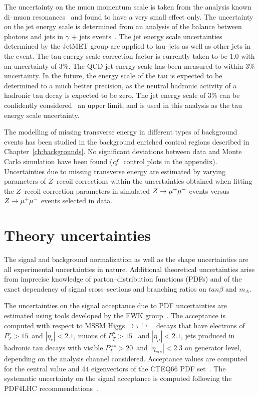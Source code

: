 The uncertainty on the muon momentum scale is taken from the analysis known
di--muon resonances~\cite{CMS_AN_2010-059} and found to have a very small effect
only.  The uncertainty on the jet energy scale is determined from an analysis of
the \pt balance between photons and jets in $\gamma$ + jets
events~\cite{CMS-PAS-JME-10-010}.  The jet energy scale uncertainties determined
by the JetMET group are applied to tau--jets as well as other jets in the event.
The tau energy scale correction factor is currently taken to be 1.0 with an
uncertainty of 3\%.  The QCD jet energy scale has been measured to within 3\%
uncertainty.  In the future, the energy scale of the tau is expected to be
determined to a much better precision, as the neutral hadronic activity of a
hadronic tau decay is expected to be zero. The jet energy scale of 3\% can be
confidently considered~\cite{CMS-PAS-TAU-11-001} an upper limit, and is used in
this analysis as the tau energy scale uncertainty.

The modelling of missing transverse energy in different types of background
events has been studied in the background enriched control regions described in
Chapter~\ref{ch:backgrounds}.  No significant deviations between data and
Monte Carlo simulation have been found ({\it cf.}\ control plots in the
appendix).  Uncertainties due to missing transverse energy are estimated by
varying parameters of $Z$--recoil corrections within the uncertainties obtained
when fitting the $Z$--recoil correction parameters in simulated $Z \to \mu^+\mu^-$
events versus $Z \to \mu^+\mu^-$ events selected in data.


\section{Theory uncertainties}

The signal and background normalization as well as the shape uncertainties are
all experimental uncertainties in nature.  Additional theoretical uncertainties
arise from imprecise knowledge of parton--distribution functions (PDFs) and of
the exact dependency of signal cross--sections and branching ratios on
$tan\beta$ and $m_A$.

The uncertainties on the signal acceptance due to PDF uncertainties are
estimated using tools developed by the EWK
group~\cite{CMS_EWK_pdfUncertaintyTools}.  The acceptance is computed with
respect to MSSM Higgs $\to \tau^+\tau^-$ decays that have electrons of $P_{T}^{e} >
15$~\GeV and $\left| \eta_{e} \right| < 2.1$, muons of $P_{T}^{\mu} > 15$~\GeV
and $\left| \eta_{\mu} \right| < 2.1$, jets produced in hadronic tau decays with
visible $P_{T}^{vis} > 20$~\GeV and $\left| \eta_{vis} \right| < 2.3$ on
generator level, depending on the analysis channel considered.  Acceptance
values are computed for the central value and $44$ eigenvectors of the CTEQ66
PDF set~\cite{CTEQpdfSet}.  The systematic uncertainty on the signal acceptance
is computed following the PDF4LHC
recommendations~\cite{pdfAccSys01,pdfAccSys02}.


